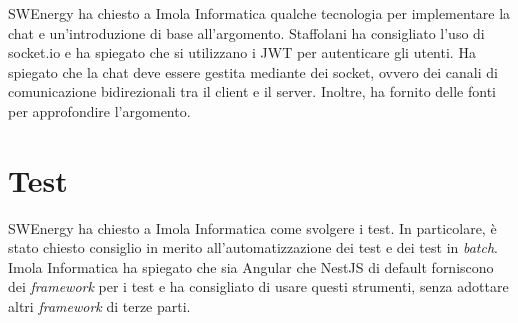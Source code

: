 SWEnergy ha chiesto a Imola Informatica qualche tecnologia per implementare la
chat e un'introduzione di base all'argomento. Staffolani ha consigliato l'uso di
socket.io e ha spiegato che si utilizzano i JWT per autenticare gli utenti. Ha 
spiegato che la
chat deve essere gestita mediante dei socket, ovvero dei canali di comunicazione
bidirezionali tra il client e il server. Inoltre, ha fornito delle fonti per 
approfondire l'argomento.

\section{Test}

SWEnergy ha chiesto a Imola Informatica come svolgere i test. In particolare, è
stato chiesto consiglio in merito all'automatizzazione dei test e dei test in
\textit{batch}. Imola Informatica ha spiegato che sia Angular che NestJS
di default forniscono dei \textit{framework} per i test e ha consigliato di
usare questi strumenti, senza adottare altri \textit{framework} di terze parti.
